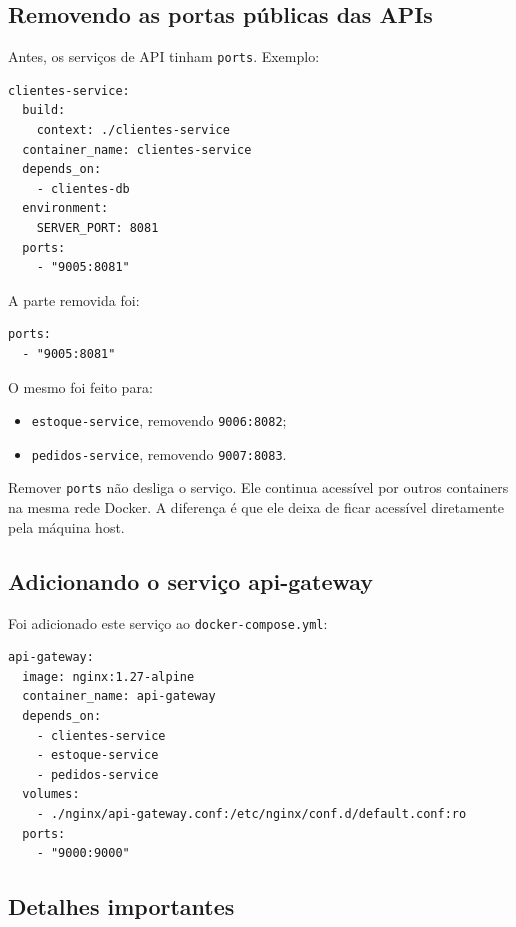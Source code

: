 \documentclass[12pt,a4paper]{article}
\begin{document}
\subsection{Removendo as portas p\'ublicas das APIs}

Antes, os servi\c{c}os de API tinham \texttt{ports}. Exemplo:

\begin{lstlisting}[style=code]
clientes-service:
  build:
    context: ./clientes-service
  container_name: clientes-service
  depends_on:
    - clientes-db
  environment:
    SERVER_PORT: 8081
  ports:
    - "9005:8081"
\end{lstlisting}

A parte removida foi:

\begin{lstlisting}[style=code]
ports:
  - "9005:8081"
\end{lstlisting}

O mesmo foi feito para:

\begin{itemize}[leftmargin=1.5em]
  \item \texttt{estoque-service}, removendo \texttt{9006:8082};
  \item \texttt{pedidos-service}, removendo \texttt{9007:8083}.
\end{itemize}

\begin{alertbox}
  Remover \texttt{ports} n\~ao desliga o servi\c{c}o. Ele continua acess\'ivel por outros containers na mesma rede Docker. A diferen\c{c}a \'e que ele deixa de ficar acess\'ivel diretamente pela m\'aquina host.
\end{alertbox}

\subsection{Adicionando o servi\c{c}o api-gateway}

Foi adicionado este servi\c{c}o ao \texttt{docker-compose.yml}:

\begin{lstlisting}[style=code]
api-gateway:
  image: nginx:1.27-alpine
  container_name: api-gateway
  depends_on:
    - clientes-service
    - estoque-service
    - pedidos-service
  volumes:
    - ./nginx/api-gateway.conf:/etc/nginx/conf.d/default.conf:ro
  ports:
    - "9000:9000"
\end{lstlisting}

\subsection{Detalhes importantes}
\end{document}
